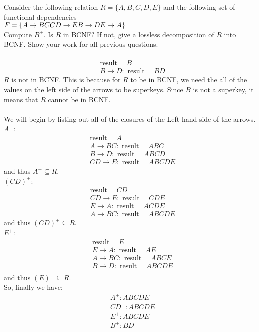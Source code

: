 \documentclass[a4 paper]{article}
\begin{document}
Consider the following relation $R = \{A, B, C, D, E\}$ and the following set of functional dependencies \\$F = \{
\\A \rightarrow BC\\
CD \rightarrow E\\
B \rightarrow D\\
E \rightarrow A\}$\\
Compute $B^{+}$. Is $R$ in BCNF? If not, give a lossless decomposition of $R$ into BCNF. Show your work for all previous questions.\\\\
\begin{align*}
  &\text{result} = B\\
  &B\rightarrow D: \text{ result} = BD
\end{align*}
$R$ is not in BCNF. This is because for $R$ to be in BCNF, we need the all of the values on the left side of the arrows to be superkeys. Since $B$ is not a superkey, it means that $R$ cannot be in BCNF.\\\\
We will begin by listing out all of the closures of the Left hand side of the arrows.
$A^+$:
\begin{align*}
  &\text{result} = A\\
  &A\rightarrow BC: \text{ result} = ABC\\
  &B\rightarrow D: \text{ result} = ABCD\\
  &CD\rightarrow E: \text{ result} = ABCDE
\end{align*}
and thus $A^+\subseteq R$.\\
$(CD)^+$:
\begin{align*}
  &\text{result} = CD\\
  &CD\rightarrow E: \text{ result} = CDE\\
  &E\rightarrow A: \text{ result} = ACDE\\
  &A\rightarrow BC: \text{ result} = ABCDE
\end{align*}
and thus $(CD)^+\subseteq R$.\\
$E^+$:
\begin{align*}
  &\text{result} = E\\
  &E\rightarrow A: \text{ result} = AE\\
  &A\rightarrow BC: \text{ result} = ABCE\\
  &B\rightarrow D: \text{ result} = ABCDE\\
\end{align*}
and thus $(E)^+\subseteq R$.\\
So, finally we have:
\begin{align*}
  &A^+: ABCDE\\
  &CD^+: ABCDE\\
  &E^+: ABCDE\\
  &B^+: BD
\end{align*}
\end{document}
